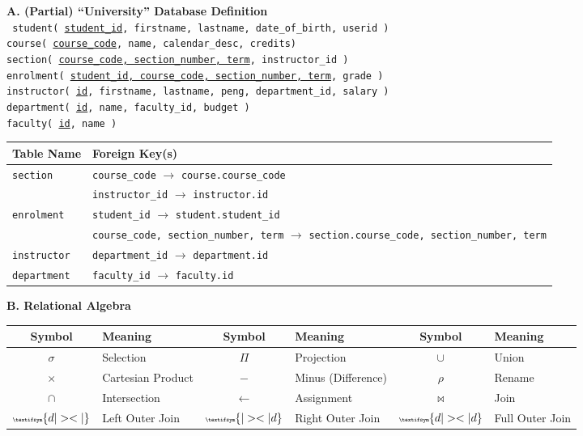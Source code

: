 \documentclass[legalpaper,10pt]{article}
\begin{document}
\textbf{A. (Partial) ``University'' Database Definition}\\
{\tt
  student( \underline{student\_id}, firstname, lastname, date\_of\_birth, userid )\\
  course( \underline{course\_code}, name, calendar\_desc, credits)\\
  section( \underline{course\_code, section\_number, term}, instructor\_id )\\
  enrolment( \underline{student\_id, course\_code, section\_number, term}, grade )\\
  instructor( \underline{id}, firstname, lastname, peng, department\_id, salary ) \\
  department( \underline{id}, name, faculty\_id, budget )\\
  faculty( \underline{id}, name )
}

\begin{tabular}{l|l}
	\textbf{Table Name} & \textbf{Foreign Key(s)} \\ \hline
	\texttt{section} & \texttt{course\_code} $\rightarrow$ \texttt{course.course\_code} \\ 
	~ & \texttt{instructor\_id} $\rightarrow$ \texttt{instructor.id} \\
	\hline
	\texttt{enrolment} & \texttt{student\_id} $\rightarrow$ \texttt{student.student\_id} \\
	~ & \texttt{course\_code, section\_number, term} $\rightarrow$ \texttt{section.course\_code, section\_number, term} \\ \hline
	\texttt{instructor} & \texttt{department\_id}  $\rightarrow$ \texttt{department.id} \\ \hline
	\texttt{department} & \texttt{faculty\_id} $\rightarrow$ \texttt{faculty.id} \\ 

\end{tabular}

\textbf{B. Relational Algebra}

\begin{tabular}{c|l||c|l||c|l}
	\textbf{Symbol} & \textbf{Meaning} & \textbf{Symbol} & \textbf{Meaning} & \textbf{Symbol} & \textbf{Meaning} \\ \hline
	
	$\sigma$ & Selection & $\Pi$ & Projection & $\cup$ & Union \\
	$ \times $ & Cartesian Product & $ - $ & Minus (Difference) & $ \rho $ & Rename \\
	$ \cap $ & Intersection &  $ \leftarrow $ & Assignment & $ \Join $ & Join \\
	${\tiny \textifsym{d|><|}} $ & Left Outer Join & ${\tiny \textifsym{|><|d}} $ & Right Outer Join & $ {\tiny \textifsym{d|><|d}} $ & Full Outer Join \\	
\end{tabular}
\end{document}
